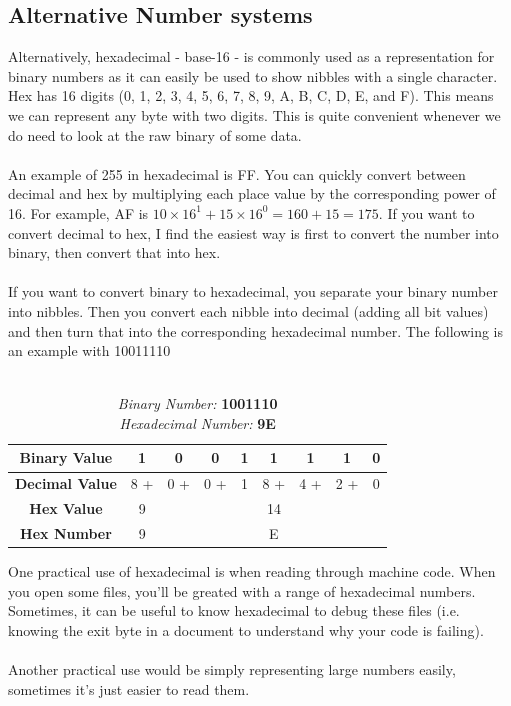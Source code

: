 \documentclass[12pt,a4paper]{book}
\begin{document}
			\subsection{Alternative Number systems}
			Alternatively, hexadecimal - base-16 - is commonly used as a representation for binary numbers as it can easily be used to show nibbles with a single character. Hex has 16 digits (0, 1, 2, 3, 4, 5, 6, 7, 8, 9, A, B, C, D, E, and F). This means we can represent any byte with two digits. This is quite convenient whenever we do need to look at the raw binary of some data.
				\\\\
			An example of 255 in hexadecimal is FF. You can quickly convert between decimal and hex by multiplying each place value by the corresponding power of 16. For example, AF is $10\times16^{1}+15\times16^{0}=160+15=175$. If you want to convert decimal to hex, I find the easiest way is first to convert the number into binary, then convert that into hex.
				\\\\
			If you want to convert binary to hexadecimal, you separate your binary number into nibbles. Then you convert each nibble into decimal (adding all bit values) and then turn that into the corresponding hexadecimal number. The following is an example with 10011110
				\begin{table}[H]
					\centering
					\label{tab:binary4}
					\begin{tabular}{c||c|c|c|c||c|c|c|c|}
						\textbf{Binary Value} & 1 & 0 & 0 & 1 & 1 & 1 & 1 & 0 \\
						\hline
						\textbf{Decimal Value} & 8 + & 0 + & 0 + & 1 & 8 + & 4 + & 2 + & 0 \\
						\hline
						\textbf{Hex Value} & 9 &&&& 14 &&&\\
						\hline
						\textbf{Hex Number} & 9 &&&& E &&&\\
					\end{tabular}
					\caption{ \\
						\textit{Binary Number:} \textbf{1001110} \\ \textit{Hexadecimal Number:} \textbf{9E}}
				\end{table}
			One practical use of hexadecimal is when reading through machine code. When you open some files, you'll be greated with a range of hexadecimal numbers. Sometimes, it can be useful to know hexadecimal to debug these files (i.e. knowing the exit byte in a document to understand why your code is failing). 
			\\\\
			Another practical use would be simply representing large numbers easily, sometimes it's just easier to read them. 
			
\end{document}
